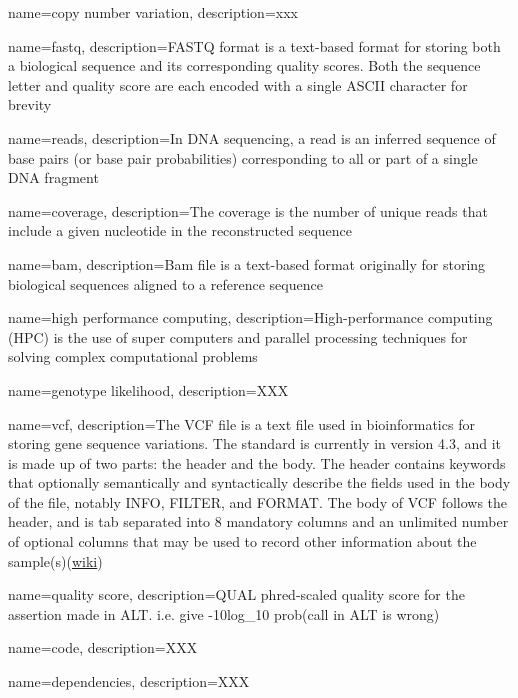 \makeglossaries

{
    name=copy number variation,
    description={xxx }
}

{
    name=fastq,
    description={FASTQ format is a text-based format for storing both a biological sequence and its corresponding quality scores. Both the sequence letter and quality score are each encoded with a single ASCII character for brevity}
}

{
    name=reads,
    description={In DNA sequencing, a read is an inferred sequence of base pairs (or base pair probabilities) corresponding to all or part of a single DNA fragment}
}

{
    name=coverage,
    description={The coverage is the number of unique reads that include a given nucleotide in the reconstructed sequence}
}

{
    name=bam,
    description={Bam file is a text-based format originally for storing biological sequences aligned to a reference sequence}
}

{
    name=high performance computing,
    description={High-performance computing (HPC) is the use of super computers and parallel processing techniques for solving complex computational problems}
}

{
    name=genotype likelihood,
    description={XXX}
}

{
    name=vcf,
    description={The VCF file is a text file used in bioinformatics for storing gene sequence variations. The standard is currently in version 4.3, and it is made up of two parts: the header and the body. The header contains keywords that optionally semantically and syntactically describe the fields used in the body of the file, notably INFO, FILTER, and FORMAT. The body of VCF follows the header, and is tab separated into 8 mandatory columns and an unlimited number of optional columns that may be used to record other information about the sample(s)(\href{http://en.wikipedia.org/wiki/Variant_Call_Format}{wiki})}
}

{
    name=quality score,
    description={QUAL phred-scaled quality score for the assertion made in ALT. i.e. give -10log_10 prob(call in ALT is wrong)}
}

{
    name=code,
    description={XXX}
}

{
    name=dependencies,
    description={XXX}
}

